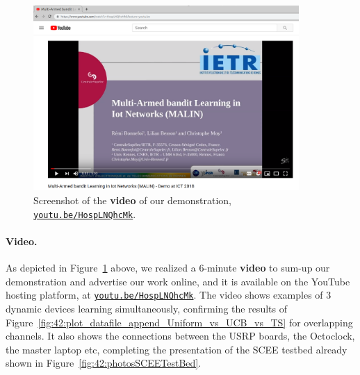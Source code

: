 \begin{figure}[!h]
	\centering
    \includegraphics[width=0.90\textwidth]{2-Chapters/4-Chapter/Images/screenshotDemoYouTube.png}
    \caption{Screenshot of the \textbf{video} of our demonstration, \texttt{\href{https://youtu.be/HospLNQhcMk}{youtu.be/HospLNQhcMk}}.}
    \label{fig:42:screenshotDemoYouTube}
\end{figure}


\paragraph{Video.}
%
As depicted in Figure~\ref{fig:42:screenshotDemoYouTube} above,
we realized a $6$-minute \textbf{video} to sum-up our demonstration and advertise our work online, and it is available on the YouTube hosting platform, at \texttt{\href{https://youtu.be/HospLNQhcMk}{youtu.be/HospLNQhcMk}}.
The video shows examples of $3$ dynamic devices learning simultaneously, confirming the results of Figure~\ref{fig:42:plot_datafile_append_Uniform_vs_UCB_vs_TS} for overlapping channels.
It also shows the connections between the USRP boards, the Octoclock, the master laptop etc, completing the presentation of the SCEE testbed already shown in Figure~\ref{fig:42:photosSCEETestBed}.

